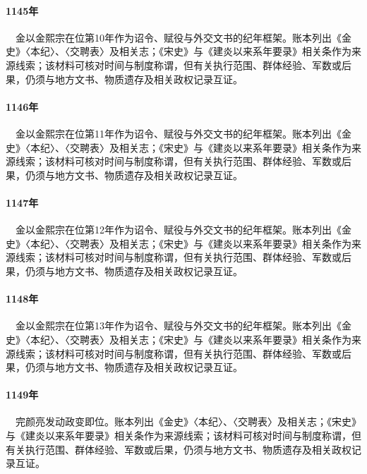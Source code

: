 \paragraph{1145年}　金以金熙宗在位第10年作为诏令、赋役与外交文书的纪年框架。账本列出《金史》〈本纪〉、〈交聘表〉及相关志；《宋史》与《建炎以来系年要录》相关条作为来源线索；该材料可核对时间与制度称谓，但有关执行范围、群体经验、军数或后果，仍须与地方文书、物质遗存及相关政权记录互证。

\paragraph{1146年}　金以金熙宗在位第11年作为诏令、赋役与外交文书的纪年框架。账本列出《金史》〈本纪〉、〈交聘表〉及相关志；《宋史》与《建炎以来系年要录》相关条作为来源线索；该材料可核对时间与制度称谓，但有关执行范围、群体经验、军数或后果，仍须与地方文书、物质遗存及相关政权记录互证。

\paragraph{1147年}　金以金熙宗在位第12年作为诏令、赋役与外交文书的纪年框架。账本列出《金史》〈本纪〉、〈交聘表〉及相关志；《宋史》与《建炎以来系年要录》相关条作为来源线索；该材料可核对时间与制度称谓，但有关执行范围、群体经验、军数或后果，仍须与地方文书、物质遗存及相关政权记录互证。

\paragraph{1148年}　金以金熙宗在位第13年作为诏令、赋役与外交文书的纪年框架。账本列出《金史》〈本纪〉、〈交聘表〉及相关志；《宋史》与《建炎以来系年要录》相关条作为来源线索；该材料可核对时间与制度称谓，但有关执行范围、群体经验、军数或后果，仍须与地方文书、物质遗存及相关政权记录互证。

\paragraph{1149年}　完颜亮发动政变即位。账本列出《金史》〈本纪〉、〈交聘表〉及相关志；《宋史》与《建炎以来系年要录》相关条作为来源线索；该材料可核对时间与制度称谓，但有关执行范围、群体经验、军数或后果，仍须与地方文书、物质遗存及相关政权记录互证。

